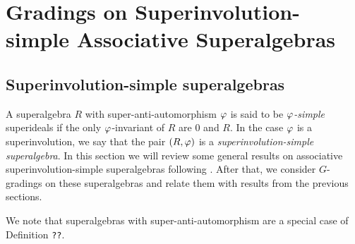 
\chapter{Gradings on Superinvolution-simple Associative Superalgebras}

\section{Superinvolution-simple superalgebras}

A superalgebra $R$ with super-anti-automorphism $\varphi$ is said to be \emph{$\varphi$-simple} %
superideals if the only $\varphi$-invariant of $R$ are $0$ and $R$. 
In the case $\varphi$ is a superinvolution, we say that the pair $(R, \varphi)$ is a \emph{superinvolution-simple superalgebra}.
In this section we will review some general results on associative superinvolution-simple superalgebras following \cite{racine}. 
After that, we consider $G$-gradings on these superalgebras and relate them with results from the previous sections.

 
We note that superalgebras with super-anti-automorphism are a special case of Definition {\tt ??}. 

    
    
    
    


